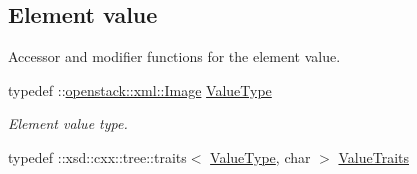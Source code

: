 \subsection*{Element value}
\label{_amgrp2ee2eae1a8c390ea033f241c027da8d6}
Accessor and modifier functions for the element value. \begin{DoxyCompactItemize}
\item 
\hypertarget{classopenstack_1_1xml_1_1Image___a6976d34f43494a1a18d2b6c0a4513017}{
typedef ::\hyperlink{classopenstack_1_1xml_1_1Image}{openstack::xml::Image} \hyperlink{classopenstack_1_1xml_1_1Image___a6976d34f43494a1a18d2b6c0a4513017}{ValueType}}
\label{classopenstack_1_1xml_1_1Image___a6976d34f43494a1a18d2b6c0a4513017}

\begin{DoxyCompactList}\small\item\em Element value type. \item\end{DoxyCompactList}\item 
\hypertarget{classopenstack_1_1xml_1_1Image___a483bdff868ed4a5054165fb88ff5dc1a}{
typedef ::xsd::cxx::tree::traits$<$ \hyperlink{classopenstack_1_1xml_1_1Image}{ValueType}, char $>$ \hyperlink{classopenstack_1_1xml_1_1Image___a483bdff868ed4a5054165fb88ff5dc1a}{ValueTraits}}
\label{classopenstack_1_1xml_1_1Image___a483bdff868ed4a5054165fb88ff5dc1a}


\end{DoxyCompactItemize}

